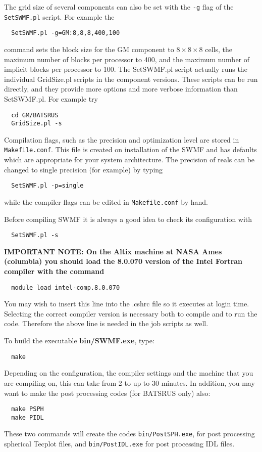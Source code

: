 The grid size of several components can also be set with the {\tt -g}
flag of the {\tt SetSWMF.pl} script. For example the 
\begin{verbatim}
  SetSWMF.pl -g=GM:8,8,8,400,100
\end{verbatim}
command sets the block size for the GM component to $8\times 8\times 8$ cells, 
the maximum number of blocks per processor to 400, 
and the maximum number of implicit blocks per processor to 100.
The SetSWMF.pl script actually runs the individual GridSize.pl
scripts in the component versions. These scripts can be run directly,
and they provide more options and more verbose information than SetSWMF.pl.
For example try
\begin{verbatim}
  cd GM/BATSRUS
  GridSize.pl -s
\end{verbatim}
Compilation flags, such as the precision and optimization 
level are stored in {\tt Makefile.conf}. This file is created on
installation of the SWMF and has defaults which are appropriate for
your system architecture.  The precision of reals
can be changed to single precision (for example) by typing
\begin{verbatim}
  SetSWMF.pl -p=single
\end{verbatim}
while the compiler flags can be edited in {\tt Makefile.conf} by hand.

Before compiling SWMF it is always a good idea to check its configuration
with
\begin{verbatim}
  SetSWMF.pl -s
\end{verbatim}

{\bf IMPORTANT NOTE:
On the Altix machine at NASA Ames (columbia)
you should load the 8.0.070 version 
of the Intel Fortran compiler 
with the command
\begin{verbatim}
  module load intel-comp.8.0.070
\end{verbatim}
You may wish to insert this line into the .cshrc file
so it executes at login time. 
Selecting the correct compiler version is 
necessary both to compile and to run the code.
Therefore the above line is needed in the job scripts
as well.}

To build the executable {\bf bin/SWMF.exe}, type:
\begin{verbatim}
  make
\end{verbatim} 
Depending on the configuration, the compiler settings and the machine 
that you are compiling on, this can take from 2 to up to 30 minutes.  
In addition, you may want to make the post processing
codes (for BATSRUS only) also:
\begin{verbatim}
  make PSPH
  make PIDL
\end{verbatim} 
These two commands will create the codes {\tt bin/PostSPH.exe}, for post
processing spherical Tecplot files, and {\tt bin/PostIDL.exe} 
for post processing IDL files.

